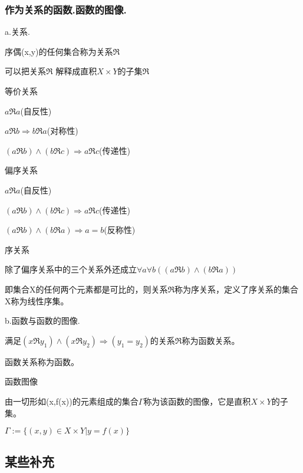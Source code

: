 \documentclass{article}
\begin{document}
	\subsubsection{作为关系的函数.函数的图像.}
	a.关系.
	\par 序偶(x,y)的任何集合称为关系$\Re $
	\par 可以把关系$\Re$ 解释成直积$X\times Y$的子集$\Re $
	~\\ \par 
	等价关系
	\par $a\Re a$(自反性)
	\par $a\Re b\Rightarrow b\Re a$(对称性)
	\par $(a\Re b)\wedge (b\Re c)\Rightarrow a\Re c$(传递性)
	~\\ \par 
	偏序关系
	 \par $a\Re a$(自反性)
	 \par $(a\Re b)\wedge (b\Re c)\Rightarrow a\Re c$(传递性)
	 \par $(a\Re b)\wedge (b\Re a)\Rightarrow a=b$(反称性)
	 ~\\ \par
	 序关系
	 \par 除了偏序关系中的三个关系外还成立$\forall a\forall b((a\Re b)\wedge (b\Re a))$
	 \par 即集合X的任何两个元素都是可比的，则关系$\Re$称为序关系，定义了序关系的集合X称为线性序集。
	 ~\\ \par 	
	 b.函数与函数的图像.
	 \par 满足$(x\Re y_1)\wedge (x\Re y_2)\Rightarrow (y_1=y_2)$的关系$\Re$称为函数关系。
	 \par 函数关系称为函数。
	~\\ \par 
	函数图像
	\par 由一切形如(x,f(x))的元素组成的集合$\Gamma$称为该函数的图像，它是直积$X\times Y$的子集。
	\par $\Gamma:=\{(x,y)\in X\times Y\rvert y=f(x)\}$
	\subsection{某些补充}
\end{document}
